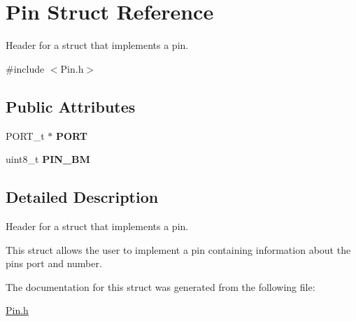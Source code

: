 \hypertarget{struct_pin}{}\section{Pin Struct Reference}
\label{struct_pin}


Header for a struct that implements a pin.  




{\ttfamily \#include $<$Pin.\+h$>$}

\subsection*{Public Attributes}
\begin{DoxyCompactItemize}
\item 
\mbox{\label{struct_pin_a770a4cf7dcce7364811c7c43be4d1cc1}} 
P\+O\+R\+T\+\_\+t $\ast$ {\bfseries P\+O\+RT}
\item 
\mbox{\label{struct_pin_ab27021b8968ba6dbaf594ca6ed3cdadc}} 
uint8\+\_\+t {\bfseries P\+I\+N\+\_\+\+BM}
\end{DoxyCompactItemize}


\subsection{Detailed Description}
Header for a struct that implements a pin. 

This struct allows the user to implement a pin containing information about the pin\textquotesingle{}s port and number. 

The documentation for this struct was generated from the following file\+:\begin{DoxyCompactItemize}
\item 
\mbox{\hyperlink{_pin_8h}{Pin.\+h}}\end{DoxyCompactItemize}
